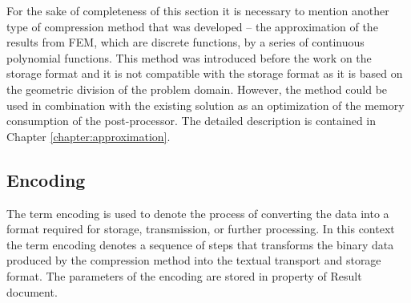 For the sake of completeness of this section it is necessary to mention another type of compression method that was developed -- the approximation of the results from FEM, which are discrete functions, by a series of continuous polynomial functions. This method was introduced before the work on the storage format and it is not compatible with the storage format as it is based on the geometric division of the problem domain. However, the method could be used in combination with the existing solution as an optimization of the memory consumption of the post-processor. The detailed description is contained in Chapter \ref{chapter:approximation}.


\subsection {Encoding}
\label{subsec:encoding}

The term encoding is used to denote the process of converting the data into a format required for storage, transmission, or further processing. In this context the term encoding denotes a sequence of steps that transforms the binary data produced by the compression method into the textual transport and storage format. The parameters of the encoding are stored in  property of Result document.

